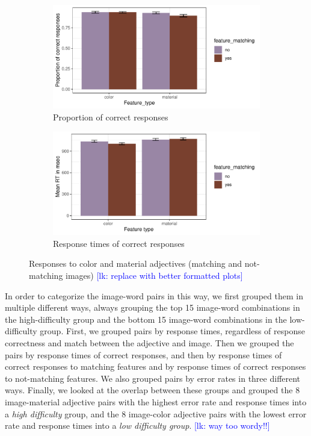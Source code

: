 \documentclass[12pt,letterpaper]{article}
\newcommand{\lk}[1]{\textcolor{Blue}{[lk: #1]}}
\begin{document}
\begin{figure}[ht]
   \begin{subfigure}{.5\textwidth}
   \centering
   \includegraphics[width=\textwidth]{plots/exp1_proportion.png}
   \caption{Proportion of correct responses}
   \label{fig:exp1_a}
   \end{subfigure}
   \begin{subfigure}{.5\textwidth}
   \centering
   \includegraphics[width=\textwidth]{plots/exp1_rt.png}
   \caption{Response times of correct responses}
   \label{fig:exp1_b}
   \end{subfigure}
   \caption{Responses to color and material adjectives (matching and not-matching images) \lk{replace with better formatted plots}}
   \label{fig:exp1}
   \end{figure}   

In order to categorize the image-word pairs in this way, we first grouped them in multiple different ways, always grouping the top 15 image-word combinations in the high-difficulty group and the bottom 15 image-word combinations in the low-difficulty group. First, we grouped pairs by response times, regardless of response correctness and match between the adjective and image. Then we grouped the pairs by response times of correct responses, and then by response times of correct responses to matching features and by response times of correct responses to not-matching features. We also grouped pairs by error rates in three different ways. Finally, we looked at the overlap between these groups and grouped the 8 image-material adjective pairs with the highest error rate and response times into a \textit{high difficulty} group, and the 8 image-color adjective pairs with the lowest error rate and response times into a \textit{low difficulty group}. \lk {way too wordy!!}
\end{document}
